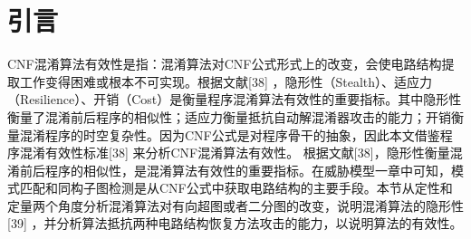 \section{引言}
CNF混淆算法有效性是指：混淆算法对CNF公式形式上的改变，会使电路结构提取工作变得困难或根本不可实现。根据文献[38]  ，隐形性（Stealth）、适应力（Resilience）、开销（Cost）是衡量程序混淆算法有效性的重要指标。其中隐形性衡量了混淆前后程序的相似性；适应力衡量抵抗自动解混淆器攻击的能力；开销衡量混淆程序的时空复杂性。因为CNF公式是对程序骨干的抽象，因此本文借鉴程序混淆有效性标准[38]  来分析CNF混淆算法有效性。
根据文献[38]，隐形性衡量混淆前后程序的相似性，是混淆算法有效性的重要指标。在威胁模型一章中可知，模式匹配和同构子图检测是从CNF公式中获取电路结构的主要手段。本节从定性和定量两个角度分析混淆算法对有向超图或者二分图的改变，说明混淆算法的隐形性[39]  ，并分析算法抵抗两种电路结构恢复方法攻击的能力，以说明算法的有效性。
